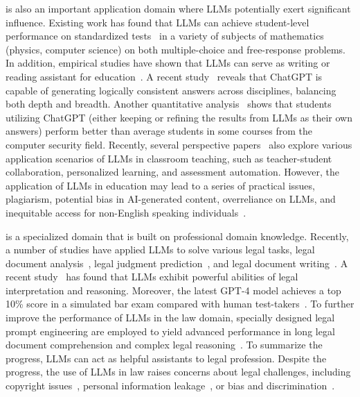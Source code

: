{
is also an important application domain where LLMs potentially exert significant influence.  %
Existing work has found that LLMs can achieve student-level performance on standardized tests~\cite{OpenAI-OpenAI-2023-GPT-4} in a variety of  subjects of mathematics (\eg physics, computer science) on both multiple-choice and free-response problems.
In addition, empirical studies have shown that LLMs can  serve as writing or reading assistant  for education~\cite{Malinka-arxiv-2023-Education,Susnjak-arxiv-2022-Education}.
A recent study~\cite{Susnjak-arxiv-2022-Education} reveals that 
ChatGPT is capable of generating logically consistent answers across disciplines, balancing both depth and breadth.
Another quantitative analysis~\cite{Malinka-arxiv-2023-Education} shows that {students utilizing ChatGPT (either keeping or refining the results from LLMs as their own answers) perform better than average students in some courses from the computer security field. 
{Recently, several perspective papers~\cite{Tan-arxiv-2023-towards,Kamalov-2023-arxiv-A} also explore various application scenarios of LLMs in classroom teaching, such as teacher-student collaboration, personalized learning, and assessment automation.}
{However, the application of LLMs in education may lead to a series of practical issues, \eg  plagiarism, potential bias in AI-generated content, overreliance  on LLMs, and inequitable access for non-English speaking individuals~\cite{Kasneci-learning-2023-chatgpt}.}
}


is a specialized domain that is built on professional domain knowledge. 
{Recently, a number of studies have applied LLMs} to solve various legal tasks, \eg legal document analysis~\cite{Stanek-arxiv-2023-Can}, legal judgment prediction~\cite{Trautmann-arxiv-2022-Legal}, and legal document writing~\cite{Choi-SSRN-2023-Chatgpt}. A recent study~\cite{Nay-arxiv-2022-Law} has found that 
{LLMs exhibit powerful abilities of legal interpretation and reasoning.} 
Moreover, the latest GPT-4 model achieves a top 10\% score in a simulated bar exam compared with human test-takers~\cite{OpenAI-OpenAI-2023-GPT-4}. 
{
To further improve the performance of LLMs in the law domain,  specially designed legal prompt engineering are employed to  yield advanced performance in long legal document comprehension and complex legal reasoning~\cite{Yu-2022-arxiv-Legal,Trautmann-2022-arxiv-Legal}.
To summarize the progress, LLMs can act as helpful assistants to legal profession.  
Despite the progress, the use of LLMs in law raises concerns about legal challenges, including copyright issues~\cite{Tamkin-arxiv-2021-Understanding}, personal information leakage~\cite{Sun-arxiv-2023-A}, or bias and discrimination~\cite{Abid-AIES-2021-Persistent}.
}


}
